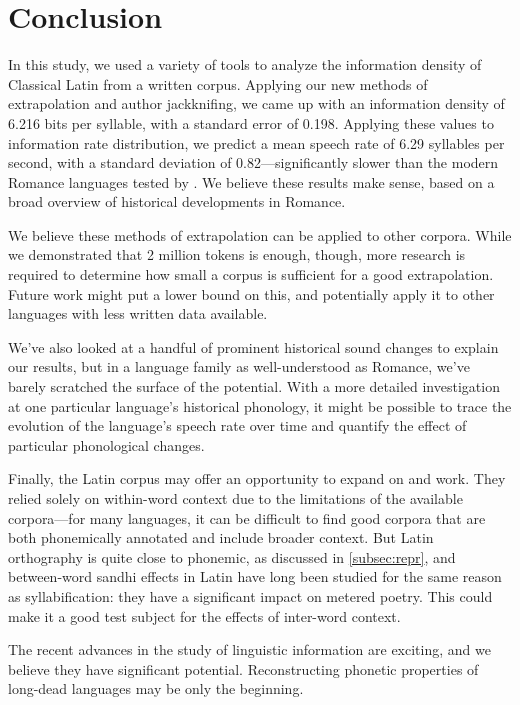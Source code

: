 \documentclass[12pt,twoside]{article}
\begin{document}
\section{Conclusion}
\label{sec:concl}

In this study, we used a variety of tools to analyze the information density of Classical Latin from a written corpus. Applying our new methods of extrapolation and author jackknifing, we came up with an information density of 6.216 bits per syllable, with a standard error of 0.198. Applying these values to  information rate distribution, we predict a mean speech rate of 6.29 syllables per second, with a standard deviation of 0.82---significantly slower than the modern Romance languages tested by \citeauthor{coupé}. We believe these results make sense, based on a broad overview of historical developments in Romance.

We believe these methods of extrapolation can be applied to other corpora. While we demonstrated that 2 million tokens is enough, though, more research is required to determine how small a corpus is sufficient for a good extrapolation. Future work might put a lower bound on this, and potentially apply it to other languages with less written data available.

We've also looked at a handful of prominent historical sound changes to explain our results, but in a language family as well-understood as Romance, we've barely scratched the surface of the potential. With a more detailed investigation at one particular language's historical phonology, it might be possible to trace the evolution of the language's speech rate over time and quantify the effect of particular phonological changes.

Finally, the Latin corpus may offer an opportunity to expand on \citet{oh} and  work. They relied solely on within-word context due to the limitations of the available corpora---for many languages, it can be difficult to find good corpora that are both phonemically annotated and include broader context. But Latin orthography is quite close to phonemic, as discussed in \ref{subsec:repr}, and between-word sandhi effects in Latin have long been studied for the same reason as syllabification: they have a significant impact on metered poetry. This could make it a good test subject for the effects of inter-word context.

The recent advances in the study of linguistic information are exciting, and we believe they have significant potential. Reconstructing phonetic properties of long-dead languages may be only the beginning.
\end{document}
